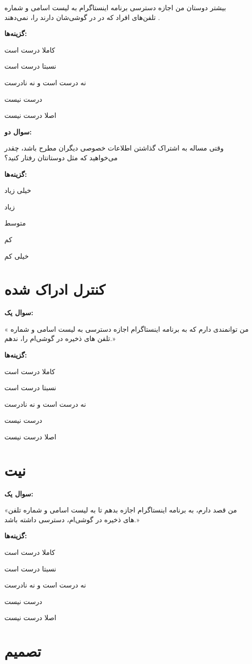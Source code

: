 بیشتر دوستان من اجازه دسترسی برنامه اینستاگرام به لیست اسامی و شماره تلفن‌‌های افراد که در در گوشی‌شان دارند را، نمی‌دهند . 

\textbf{گزینه‌ها:}

کاملا درست است

نسبتا درست است

نه درست است و نه نادرست

درست نیست

اصلا درست نیست

\textbf{سوال دو:}

وقتی مساله به اشتراک گذاشتن اطلاعات خصوصی دیگران مطرح باشد، چقدر می‌خواهید که
مثل دوستانتان رفتار کنید؟ 

\textbf{گزینه‌ها:}

خیلی زیاد

زیاد

متوسط

کم

خیلی کم

\section*{کنترل ادراک شده}

\textbf{سوال یک:}

« من توانمندی دارم که به برنامه اینستاگرام اجازه دسترسی به لیست اسامی و شماره تلفن های ذخیره در گوشی‌ام را، ندهم.» 

\textbf{گزینه‌ها:}

کاملا درست است

نسبتا درست است

نه درست است و نه نادرست

درست نیست

اصلا درست نیست

\section*{نیت}

\textbf{سوال یک:}

«من قصد دارم، به برنامه اینستاگرام اجازه بدهم تا به لیست اسامی و شماره تلفن های ذخیره در گوشی‌ام، دسترسی داشته باشد.» 

\textbf{گزینه‌ها:}


کاملا درست است

نسبتا درست است

نه درست است و نه نادرست

درست نیست

اصلا درست نیست

\section*{تصمیم}


